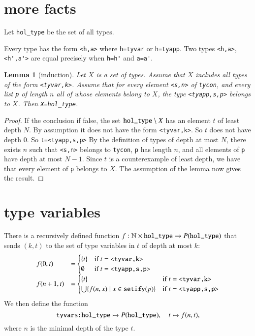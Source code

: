 \documentclass[cup9a]{cupbook}
\newtheorem{lemma}{Lemma}[chapter]
\begin{document}
\section{more facts}

Let \verb!hol_type! be the set of all types.

Every type has the form \verb!<h,a>! where \verb!h=tyvar! or \verb!h=tyapp!.  Two types \verb!<h,a>!, \verb!<h',a'>! are equal precisely when \verb!h=h'! and \verb!a=a'!.

\begin{lemma}[induction]  Let $X$ is a set of types. Assume that $X$ includes all types of the form \verb!<tyvar,k>!.  Assume that for every element \verb!<s,n>! of \verb!tycon!, and every list \verb!p! of length $n$ all of whose elements belong to $X$, the type \verb!<tyapp,s,p>! belongs to $X$.  Then \verb!X=hol_type!.
\end{lemma}

\begin{proof} If the conclusion if false, the set $\verb!hol_type!\setminus X$ has an element $t$ of least depth $N$.  By assumption it does not have the form \verb!<tyvar,k>!.  So $t$ does not have depth $0$.  So \verb!t=<tyapp,s,p>!   By the definition of types of depth at most $N$, there exists $n$ such that \verb!<s,n>! belongs to \verb!tycon!, \verb!p! has length $n$, and all elements of \verb!p! have depth at most $N-1$.  Since $t$ is a counterexample of least depth, we have that every element of \verb!p! belongs to $X$.  The assumption of the lemma now gives the result.
\end{proof}



\section{type variables}




There is a recursively defined function $f:\ring{N}\times \verb!hol_type!\to P(\verb!hol_type!)$ that sends $(k,t)$ to the set of type variables in $t$ of depth at most $k$:
$$
\begin{array}{lll}
f(0,t) &= \begin{cases} \{t\} &\hbox{if } t = \verb!<tyvar,k>!\\ \emptyset &\hbox{if } t = \verb!<tyapp,s,p>!\end{cases}\\
f(n+1,t) &= \begin{cases} \{t\} &\hbox{if } t= \verb!<tyvar,k>!\\ \bigcup\{ f(n,x) \mid x \in \verb!setify!(p) \} &\hbox{if } t = \verb!<tyapp,s,p>!\end{cases}\\
\end{array}
$$
We then define the function
$$
\verb!tyvars:hol_type!\mapsto P(\verb!hol_type!),\quad
t \mapsto f(n,t),
$$
where $n$ is the minimal depth of the type $t$.
\end{document}
